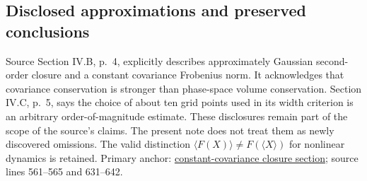 \subsection{Disclosed approximations and preserved conclusions}
Source Section IV.B, p.~4, explicitly describes approximately Gaussian
second-order closure and a constant covariance Frobenius norm. It acknowledges
that covariance conservation is stronger than phase-space volume conservation.
Section IV.C, p.~5, says the choice of about ten grid points used in its width
criterion is an arbitrary order-of-magnitude estimate. These disclosures remain
part of the scope of the source's claims. The present note does not treat them
as newly discovered omissions. The valid distinction
$\langle F(X)\rangle\ne F(\langle X\rangle)$ for nonlinear dynamics is retained.
Primary anchor:
\href{https://arxiv.org/html/2609.28999v2#S4.SS2}{constant-covariance closure section};
source lines 561--565 and 631--642.

